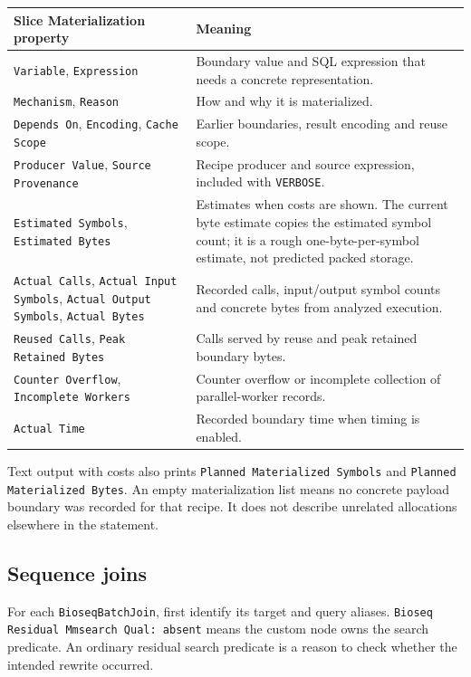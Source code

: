 \begingroup\small
\begin{longtable}{@{}p{.46\linewidth}p{.49\linewidth}@{}}
\toprule
\textbf{Slice Materialization property} & \textbf{Meaning}\\
\midrule\endhead
\texttt{Variable}, \texttt{Expression} & Boundary value and SQL expression
that needs a concrete representation.\\
\texttt{Mechanism}, \texttt{Reason} & How and why it is materialized.\\
\texttt{Depends On}, \texttt{Encoding}, \texttt{Cache Scope} & Earlier
boundaries, result encoding and reuse scope.\\
\texttt{Producer Value}, \texttt{Source Provenance} & Recipe producer and
source expression, included with \texttt{VERBOSE}.\\
\texttt{Estimated Symbols}, \texttt{Estimated Bytes} & Estimates when
costs are shown. The current byte estimate copies the estimated symbol count;
it is a rough one-byte-per-symbol estimate, not predicted packed storage.\\
\texttt{Actual Calls}, \texttt{Actual Input Symbols},
\texttt{Actual Output Symbols}, \texttt{Actual Bytes} & Recorded calls,
input/output symbol counts and concrete bytes from analyzed execution.\\
\texttt{Reused Calls}, \texttt{Peak Retained Bytes} & Calls served by reuse
and peak retained boundary bytes.\\
\texttt{Counter Overflow}, \texttt{Incomplete Workers} & Counter overflow
or incomplete collection of parallel-worker records.\\
\texttt{Actual Time} & Recorded boundary time when timing is enabled.\\
\bottomrule
\end{longtable}
\endgroup

Text output with costs also prints \texttt{Planned Materialized Symbols} and
\texttt{Planned Materialized Bytes}. An empty materialization list means no
concrete payload boundary was recorded for that recipe. It does not describe
unrelated allocations elsewhere in the statement.

\subsection{Sequence joins}

For each \texttt{BioseqBatchJoin}, first identify its target and query aliases.
\texttt{Bioseq Residual Mmsearch Qual: absent} means the custom node owns
the search predicate. An ordinary residual search predicate is a reason to
check whether the intended rewrite occurred.

